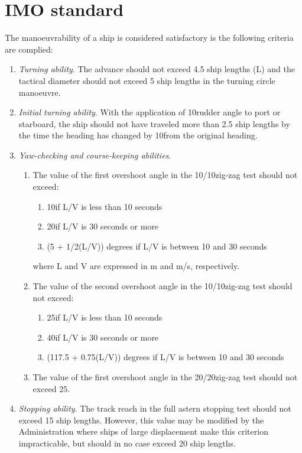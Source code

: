 \section*{IMO standard}
The manoeuvrability of a ship is considered satisfactory is the following criteria are complied:
\begin{enumerate}
	\item \emph{Turning ability}. The advance should not exceed 4.5 ship lengths (L) and the tactical diameter should not exceed 5 ship lengths in the turning circle manoeuvre.
	\item \emph{Initial turning ability}. With the application of 10\degree rudder angle to port or starboard, the ship should not have traveled more than 2.5 ship lengths by the time the heading has changed by 10\degree from the original heading. 
	\item \emph{Yaw-checking and course-keeping abilities}. 
	\begin{enumerate}
		\item The value of the first overshoot angle in the 10\degree/10\degree zig-zag test should not exceed: 
		\begin{enumerate}
			\item 10\degree if L/V is less than 10 seconds
			\item 20\degree if L/V is 30 seconds or more
			\item (5 + 1/2(L/V)) degrees if L/V is between 10 and 30 seconds
		\end{enumerate}
		where L and V are expressed in m and m/s, respectively.
		\item The value of the second overshoot angle in the 10\degree/10\degree zig-zag test should not exceed:
		\begin{enumerate}
			\item 25\degree if L/V is less than 10 seconds
			\item 40\degree if L/V is 30 seconds or more
			\item (117.5 + 0.75(L/V)) degrees if L/V is between 10 and 30 seconds
		\end{enumerate}
		\item The value of the first overshoot angle in the 20\degree/20\degree zig-zag test should not exceed 25\degree. 
	\end{enumerate}
	\item \emph{Stopping ability}. The track reach in the full astern stopping test should not exceed 15 ship lengths. However, this value may be modified by the Administration where ships of large displacement make this criterion impracticable, but should in no case exceed	20 ship lengths. 
\end{enumerate}


